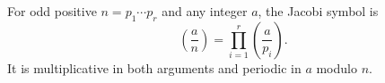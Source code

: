 For odd positive $n = p_1\cdots p_r$ and any integer $a$, the Jacobi symbol is
$$\left(\frac{a}{n}\right) = \prod_{i=1}^{r}\left(\frac{a}{p_i}\right).$$
It is multiplicative in both arguments and periodic in $a$ modulo $n$.
